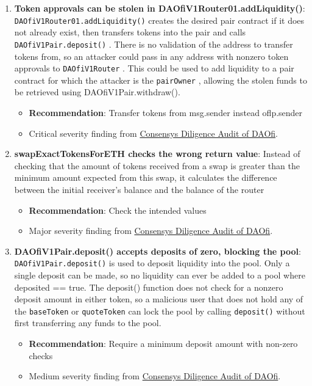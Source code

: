 \begin{enumerate}
\item\textbf{Token approvals can be stolen in DAOfiV1Router01.addLiquidity()}: \verb|DAOfiV1Router01.addLiquidity()|  creates the desired pair contract if it does not already exist, then transfers tokens into the pair and calls \verb|DAOfiV1Pair.deposit()| . There is no validation of the address to transfer tokens from, so an attacker could pass in any address with nonzero token approvals to \verb|DAOfiV1Router| . This could be used to add liquidity to a pair contract for which the attacker is the \verb|pairOwner| , allowing the stolen funds to be retrieved using DAOfiV1Pair.withdraw().
	\begin{itemize}
	\item\textbf{Recommendation}: Transfer tokens from msg.sender instead of\linebreak lp.sender
	\item Critical severity finding from \href{https://consensys.net/diligence/audits/2021/02/daofi/\#token-approvals-can-be-stolen-in-daofiv1router01-addliquidity}{Consensys Diligence Audit of DAOfi}.
	\end{itemize}

\item\textbf{swapExactTokensForETH checks the wrong return value}: Instead of checking that the amount of tokens received from a swap is greater than the minimum amount expected from this swap, it calculates the difference between the initial receiver’s balance and the balance of the router
	\begin{itemize}
	\item\textbf{Recommendation}: Check the intended values
	\item Major severity finding from \href{https://consensys.net/diligence/audits/2021/02/daofi/\#the-swapexacttokensforeth-checks-the-wrong-return-value}{Consensys Diligence Audit of DAOfi}.
	\end{itemize}

\item\textbf{DAOfiV1Pair.deposit() accepts deposits of zero, blocking the pool}: \verb|DAOfiV1Pair.deposit()|  is used to deposit liquidity into the pool. Only a single deposit can be made, so no liquidity can ever be added to a pool where deposited == true. The deposit() function does not check for a nonzero deposit amount in either token, so a malicious user that does not hold any of the \verb|baseToken|  or \verb|quoteToken|  can lock the pool by calling \verb|deposit()| without first transferring any funds to the pool.
	\begin{itemize}
	\item\textbf{Recommendation}: Require a minimum deposit amount with non-zero checks
	\item Medium severity finding from \href{https://consensys.net/diligence/audits/2021/02/daofi/\#daofiv1pair-deposit-accepts-deposits-of-zero-blocking-the-pool}{Consensys Diligence Audit of DAOfi}.
	\end{itemize}


\end{enumerate}
